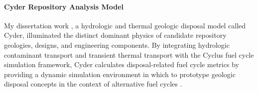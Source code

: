 \documentclass[a4paper, 12pt]{article}
\begin{document}
\paragraph{Cyder Repository Analysis Model}


My dissertation work \cite{huff_integrated_2013}, a hydrologic and thermal 
geologic disposal model called Cyder, illuminated the distinct dominant physics 
of candidate repository geologies, designs, and engineering components. By 
integrating hydrologic contaminant transport \cite{huff_sensitivity_2012} and 
transient thermal transport \cite{huff_numerical_2012} with the Cyclus fuel 
cycle simulation framework, Cyder calculates disposal-related fuel cycle metrics 
by providing a dynamic simulation environment in which to prototype geologic 
disposal concepts in the context of alternative fuel cycles 
\cite{huff_cyclus_2013}.  

%
%
\end{document}
